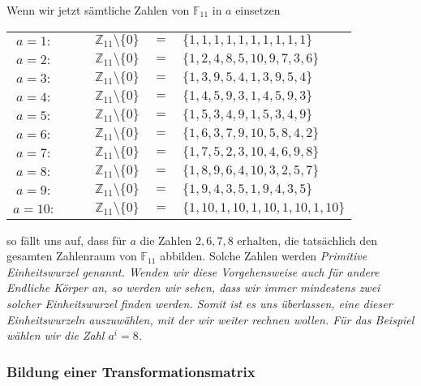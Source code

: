 Wenn wir jetzt sämtliche Zahlen von $\mathbb{F}_{11}$ in $a$ einsetzen
\begin{center}
\begin{tabular}{c r c l}
$a = 1 :$& $\qquad \mathbb{Z}_{11}\setminus\{0\}$ &$=$& $\{1, 1, 1, 1, 1, 1, 1, 1, 1, 1\}$ \\
$a = 2 :$& $\qquad \mathbb{Z}_{11}\setminus\{0\}$ &$=$& $\{1, 2, 4, 8, 5, 10, 9, 7, 3, 6\}$ \\
$a = 3 :$& $\qquad \mathbb{Z}_{11}\setminus\{0\}$ &$=$& $\{1, 3, 9, 5, 4, 1, 3, 9, 5, 4\}$ \\
$a = 4 :$& $\qquad \mathbb{Z}_{11}\setminus\{0\}$ &$=$& $\{1, 4, 5, 9, 3, 1, 4, 5, 9, 3\}$ \\
$a = 5 :$& $\qquad \mathbb{Z}_{11}\setminus\{0\}$ &$=$& $\{1, 5, 3, 4, 9, 1, 5, 3, 4, 9\}$ \\
$a = 6 :$& $\qquad \mathbb{Z}_{11}\setminus\{0\}$ &$=$& $\{1, 6, 3, 7, 9, 10, 5, 8, 4, 2\}$ \\
$a = 7 :$& $\qquad \mathbb{Z}_{11}\setminus\{0\}$ &$=$& $\{1, 7, 5, 2, 3, 10, 4, 6, 9, 8\}$ \\
$a = 8 :$& $\qquad \mathbb{Z}_{11}\setminus\{0\}$ &$=$& $\{1, 8, 9, 6, 4, 10, 3, 2, 5, 7\}$ \\
$a = 9 :$& $\qquad \mathbb{Z}_{11}\setminus\{0\}$ &$=$& $\{1, 9, 4, 3, 5, 1, 9, 4, 3, 5\}$ \\
$a = 10 :$& $\qquad \mathbb{Z}_{11}\setminus\{0\}$ &$=$& $\{1, 10, 1, 10, 1, 10, 1, 10, 1, 10\}$	
\end{tabular}
\end{center}
so fällt uns auf, dass für $a$ die Zahlen $2,6,7,8$ erhalten, die tatsächlich den gesamten Zahlenraum von $\mathbb{F}_{11}$ abbilden. Solche Zahlen werden \em Primitive Einheitswurzel \em genannt. 
Wenden wir diese Vorgehensweise auch für andere Endliche Körper an, so werden wir sehen, dass wir immer mindestens zwei solcher Einheitswurzel finden werden. Somit ist es uns überlassen, eine dieser Einheitswurzeln auszuwählen, mit der wir weiter rechnen wollen. Für das Beispiel wählen wir die Zahl $a^i = 8$.

\subsubsection{Bildung einer Transformationsmatrix
	\label{reedsolomon:subsection:transMat}}

